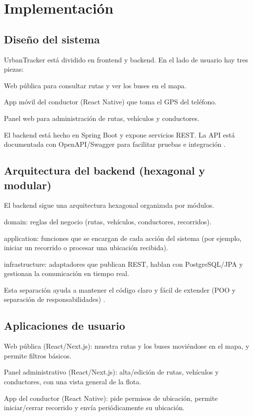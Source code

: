 \section{Implementación}

\subsection{Diseño del sistema}
UrbanTracker está dividido en frontend y backend. En el lado de usuario hay tres piezas:

Web pública para consultar rutas y ver los buses en el mapa.

App móvil del conductor (React Native) que toma el GPS del teléfono.

Panel web para administración de rutas, vehículos y conductores.

El backend está hecho en Spring Boot y expone servicios REST. La API está documentada con OpenAPI/Swagger para facilitar pruebas e integración \cite{easyrest2022}.

\subsection{Arquitectura del backend (hexagonal y modular)}
El backend sigue una arquitectura hexagonal organizada por módulos.

domain: reglas del negocio (rutas, vehículos, conductores, recorridos).

application: funciones que se encargan de cada acción del sistema (por ejemplo, iniciar un recorrido o procesar una ubicación recibida).

infrastructure: adaptadores que publican REST, hablan con PostgreSQL/JPA y gestionan la comunicación en tiempo real.

Esta separación ayuda a mantener el código claro y fácil de extender (POO y separación de responsabilidades) \cite{poo2023}.

\subsection{Aplicaciones de usuario}
Web pública (React/Next.js): muestra rutas y los buses moviéndose en el mapa, y permite filtros básicos.

Panel administrativo (React/Next.js): alta/edición de rutas, vehículos y conductores, con una vista general de la flota.

App del conductor (React Native): pide permisos de ubicación, permite iniciar/cerrar recorrido y envía periódicamente su ubicación.

